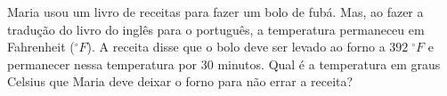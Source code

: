 %
%
    Maria usou um livro de receitas para fazer um bolo de fubá. Mas, ao fazer a tradução do livro do inglês para o português, a temperatura permaneceu em Fahrenheit ($^\circ F$). A receita disse que o bolo deve ser levado ao forno a $392\;^\circ F$ e permanecer nessa temperatura por 30 minutos. Qual é a temperatura em graus Celsius que Maria deve deixar o forno para não errar a receita?
